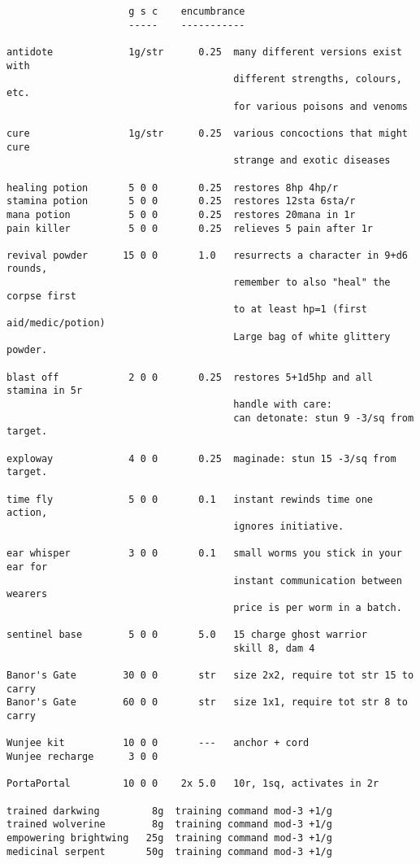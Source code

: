 \small
\begin{verbatim}
                     g s c    encumbrance
                     -----    -----------

antidote             1g/str      0.25  many different versions exist with
                                       different strengths, colours, etc.
                                       for various poisons and venoms

cure                 1g/str      0.25  various concoctions that might cure
                                       strange and exotic diseases

healing potion       5 0 0       0.25  restores 8hp 4hp/r
stamina potion       5 0 0       0.25  restores 12sta 6sta/r
mana potion          5 0 0       0.25  restores 20mana in 1r
pain killer          5 0 0       0.25  relieves 5 pain after 1r

revival powder      15 0 0       1.0   resurrects a character in 9+d6 rounds,
                                       remember to also "heal" the corpse first
                                       to at least hp=1 (first aid/medic/potion)
                                       Large bag of white glittery powder.

blast off            2 0 0       0.25  restores 5+1d5hp and all stamina in 5r
                                       handle with care:
                                       can detonate: stun 9 -3/sq from target.

exploway             4 0 0       0.25  maginade: stun 15 -3/sq from target.

time fly             5 0 0       0.1   instant rewinds time one action,
                                       ignores initiative.

ear whisper          3 0 0       0.1   small worms you stick in your ear for
                                       instant communication between wearers
                                       price is per worm in a batch.

sentinel base        5 0 0       5.0   15 charge ghost warrior
                                       skill 8, dam 4

Banor's Gate        30 0 0       str   size 2x2, require tot str 15 to carry
Banor's Gate        60 0 0       str   size 1x1, require tot str 8 to carry

Wunjee kit          10 0 0       ---   anchor + cord
Wunjee recharge      3 0 0

PortaPortal         10 0 0    2x 5.0   10r, 1sq, activates in 2r

trained darkwing         8g  training command mod-3 +1/g
trained wolverine        8g  training command mod-3 +1/g
empowering brightwing   25g  training command mod-3 +1/g
medicinal serpent       50g  training command mod-3 +1/g

\end{verbatim}
\normalsize








